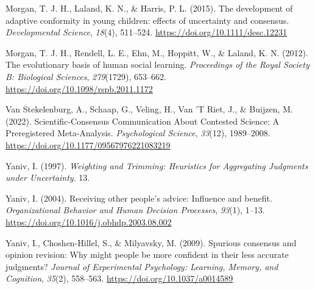 \documentclass[
  doc,floatsintext]{apa6}
\newlength{\cslhangindent}
\newlength{\cslentryspacingunit} %
\newenvironment{CSLReferences}[2] %
 {%
  \setlength{\parindent}{0pt}
  \ifodd #1
  \let\oldpar\par
  \def\par{\hangindent=\cslhangindent\oldpar}
  \fi
  \setlength{\parskip}{#2\cslentryspacingunit}
 }%
 {}
\begin{document}
\begin{CSLReferences}{1}{0}
\leavevmode{}%
Morgan, T. J. H., Laland, K. N., \& Harris, P. L. (2015). The development of adaptive conformity in young children: effects of uncertainty and consensus. \emph{Developmental Science}, \emph{18}(4), 511--524. \url{https://doi.org/10.1111/desc.12231}

\leavevmode{}%
Morgan, T. J. H., Rendell, L. E., Ehn, M., Hoppitt, W., \& Laland, K. N. (2012). The evolutionary basis of human social learning. \emph{Proceedings of the Royal Society B: Biological Sciences}, \emph{279}(1729), 653--662. \url{https://doi.org/10.1098/rspb.2011.1172}

\leavevmode{}%
Van Stekelenburg, A., Schaap, G., Veling, H., Van 'T Riet, J., \& Buijzen, M. (2022). Scientific-Consensus Communication About Contested Science: A Preregistered Meta-Analysis. \emph{Psychological Science}, \emph{33}(12), 1989--2008. \url{https://doi.org/10.1177/09567976221083219}

\leavevmode{}%
Yaniv, I. (1997). \emph{Weighting and Trimming: Heuristics for Aggregating Judgments under Uncertainty}. 13.

\leavevmode{}%
Yaniv, I. (2004). Receiving other people{'}s advice: Influence and benefit. \emph{Organizational Behavior and Human Decision Processes}, \emph{93}(1), 1--13. \url{https://doi.org/10.1016/j.obhdp.2003.08.002}

\leavevmode{}%
Yaniv, I., Choshen-Hillel, S., \& Milyavsky, M. (2009). Spurious consensus and opinion revision: Why might people be more confident in their less accurate judgments? \emph{Journal of Experimental Psychology: Learning, Memory, and Cognition}, \emph{35}(2), 558--563. \url{https://doi.org/10.1037/a0014589}

\end{CSLReferences}
\end{document}
